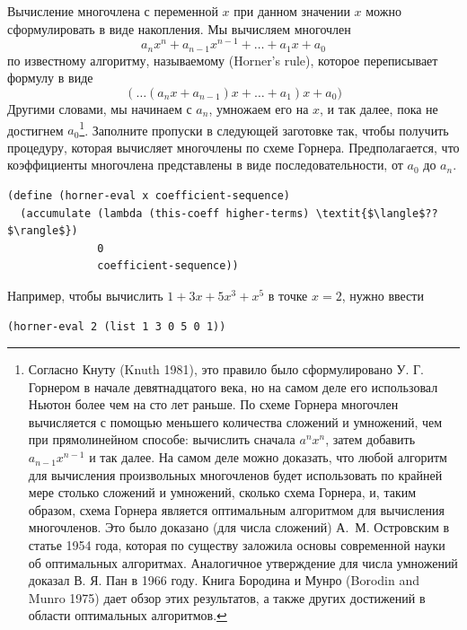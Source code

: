 \begin{exercise}{2.34}\label{EX2.34}%
Вычисление многочлена с переменной $x$ при
данном значении $x$ можно сформулировать в виде
накопления.  Мы вычисляем многочлен
$$
        a_n x^n + a_{n-1} x^{n-1} + \ldots + a_1 x + a_0
$$
по известному алгоритму, называемому 
 (Horner's rule),
которое переписывает формулу в виде
$$
        (\ldots(a_n x + a_{n-1}) x + \ldots + a_1) x + a_0)
$$
Другими словами, мы начинаем с $a_n$, умножаем его на
$x$, и так далее, пока не достигнем $a_0$\footnote{Согласно Кнуту
  (Knuth 1981),
это правило было сформулировано  У. Г. Горнером в начале девятнадцатого века, но на самом
деле его использовал  Ньютон более чем на сто лет раньше.  По схеме
Горнера многочлен вычисляется с помощью меньшего количества сложений и
умножений,
чем при прямолинейном способе: вычислить сначала $a^n x^n$,
затем добавить $a_{n-1} x^{n-1}$ и так далее.  На самом
деле можно доказать, что любой алгоритм для вычисления произвольных
многочленов будет использовать по крайней мере столько сложений и
умножений, сколько схема Горнера, и, таким образом, схема Горнера
является 
оптимальным алгоритмом для вычисления многочленов.  Это было 
доказано (для числа сложений)  А.~М. Островским
в статье 1954 года, которая по
существу заложила основы современной науки об оптимальных алгоритмах.
Аналогичное утверждение для числа умножений доказал
В. Я. Пан 
в 1966 году.  Книга Бородина и Мунро
(Borodin and Munro 1975)
дает обзор этих результатов, а также других достижений в области
оптимальных алгоритмов.}.
Заполните пропуски в следующей заготовке так, чтобы получить
процедуру, которая вычисляет многочлены по схеме Горнера.
Предполагается, что коэффициенты многочлена представлены в виде
последовательности, от $a_0$ до $a_n$.

\begin{Verbatim}[fontsize=\small]
(define (horner-eval x coefficient-sequence)
  (accumulate (lambda (this-coeff higher-terms) \textit{$\langle$??$\rangle$})
              0
              coefficient-sequence))
\end{Verbatim}
Например, чтобы вычислить $1 + 3x + 5x^3 + x^5$ в точке
$x = 2$, нужно ввести

\begin{Verbatim}[fontsize=\small]
(horner-eval 2 (list 1 3 0 5 0 1))
\end{Verbatim}
\end{exercise}
